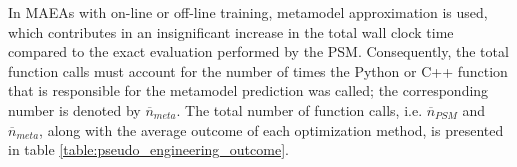 \newpage


In MAEAs with on-line or off-line training, metamodel approximation 
is used, which contributes in an insignificant increase in the 
total wall clock time compared to the exact evaluation performed by 
the PSM. Consequently, the total function calls must account for 
the number of times the Python or C++ function that is responsible 
for the metamodel prediction was called; the corresponding number 
is denoted by $\overline{n}_{meta}$. The total number of function 
calls, i.e. $\overline{n}_{PSM}$ and $\overline{n}_{meta}$, along 
with the average outcome of each optimization method, is presented 
in table \ref{table:pseudo_engineering_outcome}.

\begin{table}[h!]
\centering
\caption{Comparison between the average optimization outcome using 
plain EAs, MAEAs with on-line and off-line training after 5 runs}
\label{table:pseudo_engineering_outcome}
\end{table}


